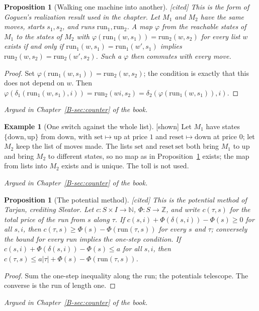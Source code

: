 \documentclass[11pt, a4paper]{article}
\theoremstyle{plain}
\newtheorem{proposition}[theorem]{Proposition}
\theoremstyle{definition}
\newtheorem{example}[theorem]{Example}
\theoremstyle{remark}
\newcommand{\N}{\mathbb{N}}
\newcommand{\Z}{\mathbb{Z}}
\newcommand{\step}{\delta}
\newcommand{\cost}{c}
\newcommand{\run}{\mathrm{run}}
\newcommand{\argued}[1]{\par\noindent\textit{Argued in Chapter~\ref{B-#1} of the book.}\par}
\newcommand{\kind}[1]{\textup{[#1]}}
\begin{document}
\begin{proposition}[Walking one machine into another]\label{spec:realization} \kind{cited}
This is the form of Goguen's realization result used in the chapter. Let $M_1$ and $M_2$ have the same moves,
starts $s_1,s_2$, and runs $\run_1,\run_2$. A map $\varphi$ from the reachable states of $M_1$ to the states of
$M_2$ with $\varphi(\run_1(w,s_1))=\run_2(w,s_2)$ for every list $w$ exists if and only if
$\run_1(w,s_1)=\run_1(w',s_1)$ implies $\run_2(w,s_2)=\run_2(w',s_2)$. Such a $\varphi$ then commutes with
every move.
\end{proposition}
\begin{proof}
Set $\varphi(\run_1(w,s_1))=\run_2(w,s_2)$; the condition is exactly that this does not depend on $w$. Then
$\varphi(\step_1(\run_1(w,s_1),i))=\run_2(wi,s_2)=\step_2(\varphi(\run_1(w,s_1)),i)$.
\end{proof}
\argued{sec:counter}

\begin{example}[One switch against the whole list]\label{spec:switch-history} \kind{shown}
Let $M_1$ have states $\{\mathrm{down},\mathrm{up}\}$ from $\mathrm{down}$, with $\mathrm{set}\mapsto\mathrm{up}$
at price $1$ and $\mathrm{reset}\mapsto\mathrm{down}$ at price $0$; let $M_2$ keep the list of moves made. The
lists $\mathrm{set}$ and $\mathrm{reset}\,\mathrm{set}$ both bring $M_1$ to $\mathrm{up}$ and bring $M_2$ to
different states, so no map as in Proposition~\ref{spec:realization} exists; the map from lists into $M_2$
exists and is unique. The toll is not used.
\end{example}
\argued{sec:counter}

\begin{proposition}[The potential method]\label{spec:potential} \kind{cited}
This is the potential method of Tarjan, crediting Sleator. Let $\cost:S\times I\to\N$, $\Phi:S\to\Z$, and write
$\cost(\tau,s)$ for the total price of the run from $s$ along $\tau$. If
$\cost(s,i)+\Phi(\step(s,i))-\Phi(s)\ge 0$ for all $s,i$, then $\cost(\tau,s)\ge\Phi(s)-\Phi(\run(\tau,s))$ for
every $s$ and $\tau$; conversely the bound for every run implies the one-step condition. If
$\cost(s,i)+\Phi(\step(s,i))-\Phi(s)\le a$ for all $s,i$, then $\cost(\tau,s)\le a|\tau|+\Phi(s)-\Phi(\run(\tau,s))$.
\end{proposition}
\begin{proof}
Sum the one-step inequality along the run; the potentials telescope. The converse is the run of length one.
\end{proof}
\argued{sec:counter}
\end{document}
